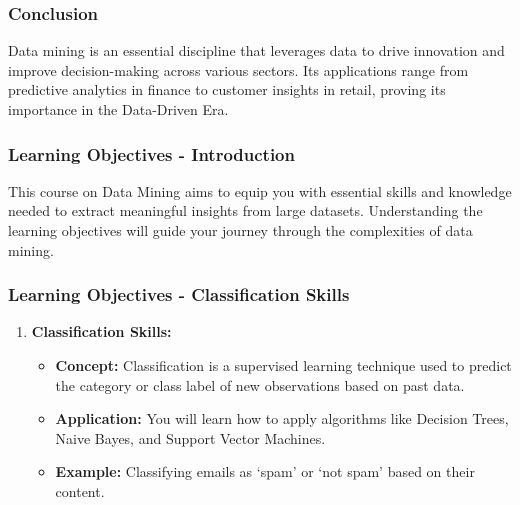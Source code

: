 \documentclass{beamer}
\begin{document}
\begin{frame}[fragile]
    \frametitle{Conclusion}
    Data mining is an essential discipline that leverages data to drive innovation and improve decision-making across various sectors. Its applications range from predictive analytics in finance to customer insights in retail, proving its importance in the Data-Driven Era.
\end{frame}

\begin{frame}[fragile]
    \frametitle{Learning Objectives - Introduction}
    This course on Data Mining aims to equip you with essential skills and knowledge needed to extract meaningful insights from large datasets. 
    Understanding the learning objectives will guide your journey through the complexities of data mining.
\end{frame}

\begin{frame}[fragile]
    \frametitle{Learning Objectives - Classification Skills}
    \begin{enumerate}
        \item \textbf{Classification Skills:}
        \begin{itemize}
            \item \textbf{Concept:} Classification is a supervised learning technique used to predict the category or class label of new observations based on past data.
            \item \textbf{Application:} You will learn how to apply algorithms like Decision Trees, Naive Bayes, and Support Vector Machines.
            \item \textbf{Example:} Classifying emails as `spam' or `not spam' based on their content.
        \end{itemize}
    \end{enumerate}
\end{frame}
\end{document}
